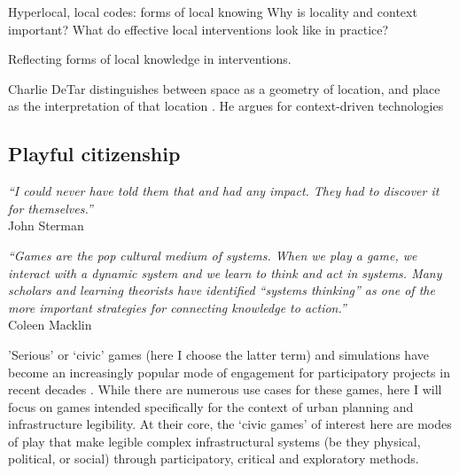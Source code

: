 \documentclass[nofonts,nols,justified,nobib]{tufte-book}
\begin{document}
Hyperlocal, local codes: forms of local knowing
Why is locality and context important?
What do effective local interventions look like in practice?

Reflecting forms of local knowledge in interventions.

Charlie DeTar distinguishes between space as a geometry of location, and place as the interpretation of that location \cite{detar_mapping_2011}. He argues for context-driven technologies 

\subsection*{Playful citizenship}

\begin{flushright}
\begin{flushright}
\emph{``I could never have told them that and had any impact. They had to discover it for themselves.''}\cite{sterman_john_2013}\\
John Sterman
\end{flushright}
\end{flushright}

\begin{flushright}
\begin{flushright}
\emph{``Games are the pop cultural medium of systems. When we play a game, we interact with a dynamic system and we learn to think and act in systems. Many scholars and learning theorists have identified ``systems thinking'' as one of the more important strategies for connecting knowledge to action.''}\cite{macklin_games_2013}\\
Coleen Macklin
\end{flushright}
\end{flushright}


'Serious' or `civic' games (here I choose the latter term) and simulations have become an increasingly popular mode of engagement for participatory projects in recent decades \cite{krivy_participatory_2013}. While there are numerous use cases for these games, here I will focus on games intended specifically for the context of urban planning and infrastructure legibility. At their core, the `civic games' of interest here are modes of play that make legible complex infrastructural systems (be they physical, political, or social) through participatory, critical and exploratory methods. 
\end{document}
